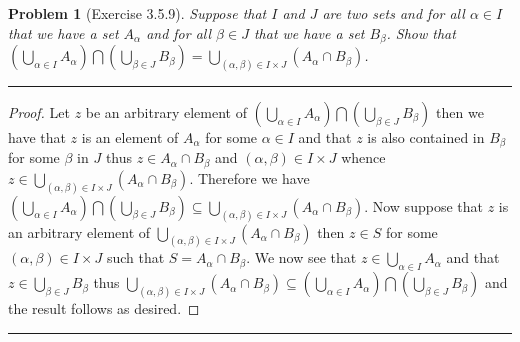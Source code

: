 \documentclass{article}
\newcommand{\lined}{\noindent\rule{\textwidth}{1pt}}
\newtheorem*{problem}{Problem}
\begin{document}
	\newpage
	
	\begin{problem}[Exercise 3.5.9]
		Suppose that $I$ and $J$ are two sets and for all $\alpha \in I$ that we have a set $A_{\alpha}$ and for all $\beta \in J$ that we have a set $B_{\beta}$. Show that $(\bigcup_{\alpha \in I}A_{\alpha}) \bigcap (\bigcup_{\beta \in J}B_{\beta}) = 
		\bigcup_{(\alpha,\beta) \in I \times J}(A_{\alpha} \cap B_{\beta})$.
	\end{problem}
	
	\lined
	\begin{proof}
		Let $z$ be an arbitrary element of $(\bigcup_{\alpha \in I}A_{\alpha}) \bigcap (\bigcup_{\beta \in J}B_{\beta})$ then we have that 
		$z$ is an element of $A_{\alpha}$ for some $\alpha \in I$ and that $z$ is also contained in $B_{\beta}$ for some $\beta$ in $J$ thus $z \in A_{\alpha} \cap B_{\beta}$ and $(\alpha,\beta) \in I \times J$ whence $z \in \bigcup_{(\alpha,\beta) \in I \times J}(A_{\alpha} \cap B_{\beta})$. Therefore we have $(\bigcup_{\alpha \in I}A_{\alpha}) \bigcap (\bigcup_{\beta \in J}B_{\beta}) \subseteq	\bigcup_{(\alpha,\beta) \in I \times J}(A_{\alpha} \cap B_{\beta})$. Now suppose that $z$ is an arbitrary element of
		$\bigcup_{(\alpha,\beta) \in I \times J}(A_{\alpha} \cap B_{\beta})$ then $z \in S$ for some $(\alpha,\beta) \in I \times J$ such
		that $S = A_{\alpha} \cap B_{\beta}$. We now see that $z \in \bigcup_{\alpha \in I} A_{\alpha}$ and that $z \in \bigcup_{\beta \in J} B_{\beta}$ thus $\bigcup_{(\alpha,\beta) \in I \times J}(A_{\alpha} \cap B_{\beta}) \subseteq (\bigcup_{\alpha \in I}A_{\alpha}) \bigcap (\bigcup_{\beta \in J}B_{\beta})$ and the result follows as desired.
		
	\end{proof}
	\lined
\end{document}
